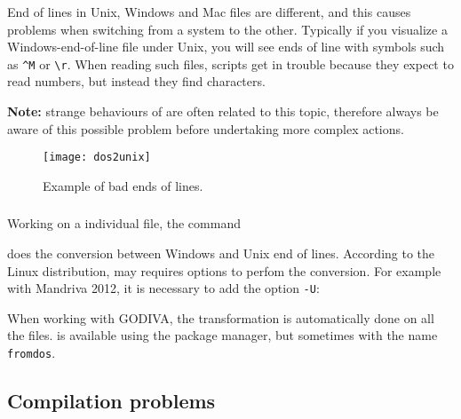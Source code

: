 \subsubsection{\question}

End of lines in Unix,  Windows and Mac files are different, and this causes problems when switching from a system to the other. Typically if you visualize a Windows-end-of-line file under Unix, you will see ends of line with symbols such as \verb|^M| or \verb|\r|. When reading such files, scripts get in trouble because they expect to read numbers, but instead they find characters.

\textbf{Note:} strange behaviours of \diva are often related to this topic, therefore always be aware of this possible problem before undertaking more complex actions.

\begin{figure}[htpb]
\centering
\texttt{[image: dos2unix]}
\caption{Example of bad ends of lines.\label{fig:error_dos2unix2}}
\end{figure}


\subsubsection{\answer}

Working on a individual file, the command\\


does the conversion between Windows and Unix end of lines. According to the Linux distribution,  may requires options to perfom the conversion. For example with Mandriva 2012, it is necessary to add the option \texttt{-U}:\\


When working with GODIVA, the transformation is automatically done on all the files.  is available using the package manager, but sometimes with the name \texttt{fromdos}.


\subsection{Compilation problems\label{sec:error_compile}}


